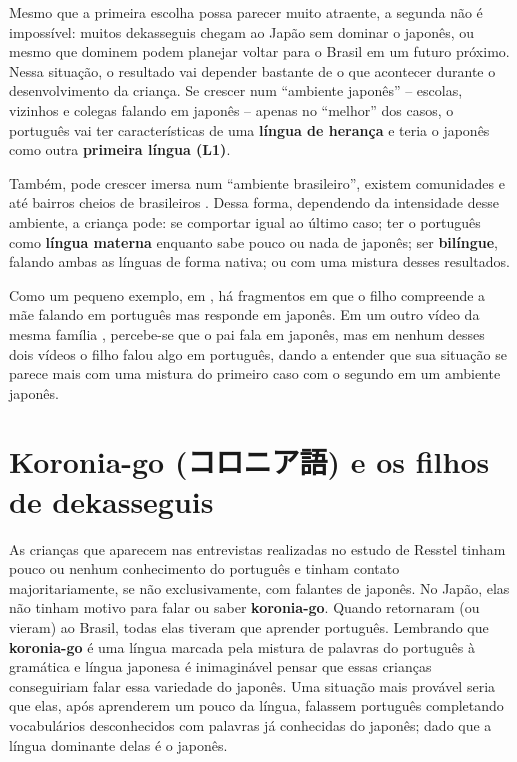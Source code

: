 \documentclass{article}
\newcommand{\jap}[1]{#1}
\newcommand{\keyword}[1]{\textbf{#1}}
\newcommand{\koroniago}{\jap{コロニア語}}
\newcommand{\koronia}{\keyword{koronia-go}}
\begin{document}
Mesmo que a primeira escolha possa parecer muito atraente,
a segunda não é impossível:
muitos dekasseguis chegam ao Japão sem dominar o japonês,
ou mesmo que dominem podem planejar voltar para o Brasil
em um futuro próximo.
Nessa situação, o resultado vai depender bastante
de o que acontecer durante o desenvolvimento da criança.
Se crescer num ``ambiente japonês''
-- escolas, vizinhos e colegas falando em japonês --
apenas no ``melhor'' dos casos,
o português vai ter características de uma
\keyword{língua de herança} e
teria o japonês como outra \keyword{primeira língua (L1)}.

Também, pode crescer imersa num ``ambiente brasileiro'',
existem comunidades e até bairros cheios de brasileiros
\cite{japaoimigrantesbrasileiros} \cite{escolasbrjp}
\cite{regioesmaisbrjp}
\cite{videobairrojpcarla} \cite{videobairrojpfernando}
\cite{videocidadebr}.
Dessa forma, dependendo da intensidade desse ambiente,
a criança pode:
se comportar igual ao último caso;
ter o português como \keyword{língua materna}
enquanto sabe pouco ou nada de japonês;
ser \keyword{bilíngue}, falando ambas as línguas de forma nativa;
ou com uma mistura desses resultados.

Como um pequeno exemplo,
em \cite{videobairrojpcarla},
há fragmentos em que o filho compreende a mãe falando
em português mas responde em japonês.
Em um outro vídeo da mesma família \cite{videoramencarla},
percebe-se que o pai fala em japonês,
mas em nenhum desses dois vídeos
o filho falou algo em português,
dando a entender que sua situação
se parece mais com uma mistura do primeiro caso
com o segundo em um ambiente japonês.

\section{Koronia-go (\koroniago{}) e os filhos de dekasseguis}

As crianças que aparecem nas entrevistas
realizadas no estudo de Resstel \cite{filhosdekasegi}
tinham pouco ou nenhum conhecimento do português e
tinham contato majoritariamente, se não exclusivamente,
com falantes de japonês.
No Japão, elas não tinham motivo para falar ou saber \koronia{}.
Quando retornaram (ou vieram) ao Brasil,
todas elas tiveram que aprender português.
Lembrando que \koronia{} é uma língua marcada pela
mistura de palavras do português à gramática e língua japonesa
é inimaginável pensar que essas crianças conseguiriam falar
essa variedade do japonês.
Uma situação mais provável seria
que elas,
após aprenderem um pouco da língua,
falassem português
completando vocabulários desconhecidos
com palavras já conhecidas do japonês;
dado que a língua dominante delas é o japonês.

\newpage

\nocite{*}


\end{document}
